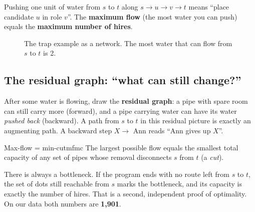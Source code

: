 \documentclass[11pt]{article}
\begin{document}
Pushing one unit of water from $s$ to $t$ along $s\to u\to v\to t$ means ``place candidate $u$ in role $v$''. The \textbf{maximum flow} (the most water you can push) equals the \textbf{maximum number of hires}.

\begin{figure}[h]
\centering
{}
\caption{The trap example as a network. The most water that can flow from $s$ to $t$ is 2.}
\end{figure}

\subsection{The residual graph: ``what can still change?''}

After some water is flowing, draw the \textbf{residual graph}: a pipe with spare room can still carry more (forward), and a pipe carrying water can have its water \emph{pushed back} (backward). A path from $s$ to $t$ in this residual picture is exactly an augmenting path. A backward step $X\to$ Ann reads ``Ann gives up $X$''.

\begin{theorem}{Max-flow = min-cut}{mfmc}
The largest possible flow equals the smallest total capacity of any set of pipes whose removal disconnects $s$ from $t$ (a \emph{cut}).
\end{theorem}

\begin{plain}
There is always a bottleneck. If the program ends with no route left from $s$ to $t$, the set of dots still reachable from $s$ marks the bottleneck, and its capacity is exactly the number of hires. That is a second, independent proof of optimality. On our data both numbers are \textbf{1{,}901}.
\end{plain}
\end{document}
